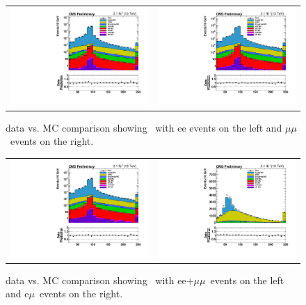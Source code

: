 \begin{figure}[!ht]
  \begin{center}
    \begin{tabular}{cc}
      \includegraphics[width=0.4\linewidth]{evtsel/figs/h_mll_ee_signalregion_inclusive_passtrig.pdf} &
      \includegraphics[width=0.4\linewidth]{evtsel/figs/h_mll_mm_signalregion_inclusive_passtrig.pdf} \\
    \end{tabular}
    \caption{
      \label{fig:datavsmc_mll_eemm}
      data vs. MC comparison showing \mll\ with ee events on the left and $\mu\mu$~events on the right.
    }
  \end{center}
\end{figure}

\begin{figure}[!ht]
  \begin{center}
    \begin{tabular}{cc}
      \includegraphics[width=0.4\linewidth]{evtsel/figs/h_mll_ll_signalregion_inclusive_passtrig.pdf} &
      \includegraphics[width=0.4\linewidth]{evtsel/figs/h_mll_em_signalregion_inclusive_passtrig.pdf} \\
    \end{tabular}
    \caption{
      \label{fig:datavsmc_mll_emll}
      data vs. MC comparison showing \mll\ with ee+$\mu\mu$~events on the left and e$\mu$~events on the right.
    }
  \end{center}
\end{figure}

